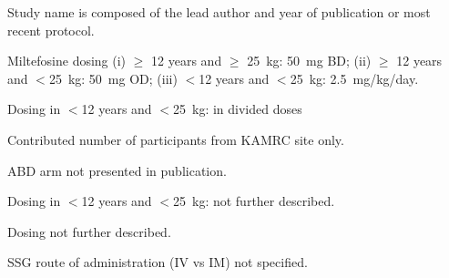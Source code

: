 
\begin{ThreePartTable}
  \captionsetup{width=1.4\textheight, font=scriptsize, skip=7pt}
  \scriptsize
  \begin{TableNotes}
    \item[1] Study name is composed of the lead author and year of publication or most recent protocol.
    \item[2] Miltefosine dosing (i) $\geq$ 12 years and $\geq$ 25~kg: 50~mg BD; (ii) $\geq$ 12 years and $<$25~kg: 50~mg OD; (iii) $<$12 years and $<$25~kg: 2.5~mg/kg/day.
    \item[3] Dosing in $<$12 years and $<$25~kg: in divided doses
    \item[4] Contributed number of participants from KAMRC site only.
    \item[5] ABD arm not presented in publication.
    \item[6] Dosing in $<$12 years and $<$25~kg: not further described.
    \item[7] Dosing not further described.
    \item[8] SSG route of administration (IV vs IM) not specified.

  \end{TableNotes}


\end{ThreePartTable}
